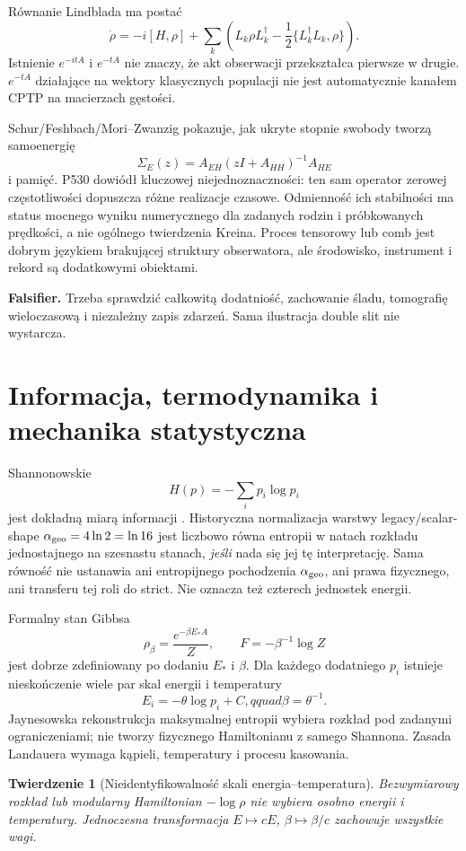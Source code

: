 \documentclass[11pt,a4paper]{article}
\newtheorem{theorem}{Twierdzenie}[section]
\begin{document}
Równanie Lindblada ma postać \cite{Lindblad,GKS}
\[
\dot\rho=-i[H,\rho]+\sum_k\left(L_k\rho L_k^\dagger-\frac12\{L_k^\dagger L_k,\rho\}\right).
\]
Istnienie $e^{-itA}$ i $e^{-tA}$ nie znaczy, że akt obserwacji przekształca pierwsze w drugie. $e^{-tA}$ działające na wektory klasycznych populacji nie jest automatycznie kanałem CPTP na macierzach gęstości.

Schur/Feshbach/Mori--Zwanzig pokazuje, jak ukryte stopnie swobody tworzą samoenergię
\[
\Sigma_E(z)=A_{EH}(zI+A_{HH})^{-1}A_{HE}
\]
i pamięć. P530 dowiódł kluczowej niejednoznaczności: ten sam operator zerowej częstotliwości dopuszcza różne realizacje czasowe. Odmienność ich stabilności ma status mocnego wyniku numerycznego dla zadanych rodzin i próbkowanych prędkości, a nie ogólnego twierdzenia Kreina. Proces tensorowy lub comb jest dobrym językiem brakującej struktury obserwatora, ale środowisko, instrument i rekord są dodatkowymi obiektami.

\textbf{Falsifier.} Trzeba sprawdzić całkowitą dodatniość, zachowanie śladu, tomografię wieloczasową i niezależny zapis zdarzeń. Sama ilustracja double slit nie wystarcza.

\section{Informacja, termodynamika i mechanika statystyczna}

Shannonowskie
\[
H(p)=-\sum_ip_i\log p_i
\]
jest dokładną miarą informacji \cite{Shannon}. Historyczna normalizacja warstwy legacy/scalar-shape $\alpha_{\rm geo}=4\ln2=\ln16$ jest liczbowo równa entropii w natach rozkładu jednostajnego na szesnastu stanach, \emph{jeśli} nada się jej tę interpretację. Sama równość nie ustanawia ani entropijnego pochodzenia $\alpha_{\rm geo}$, ani prawa fizycznego, ani transferu tej roli do strict. Nie oznacza też czterech jednostek energii.

Formalny stan Gibbsa
\[
\rho_\beta=\frac{e^{-\beta E_*A}}{Z},\qquad F=-\beta^{-1}\log Z
\]
jest dobrze zdefiniowany po dodaniu $E_*$ i $\beta$. Dla każdego dodatniego $p_i$ istnieje nieskończenie wiele par skal energii i temperatury
\[
E_i=-\theta\log p_i+C,qquad \beta=\theta^{-1}.
\]
Jaynesowska rekonstrukcja maksymalnej entropii \cite{Jaynes} wybiera rozkład pod zadanymi ograniczeniami; nie tworzy fizycznego Hamiltonianu z samego Shannona. Zasada Landauera \cite{Landauer} wymaga kąpieli, temperatury i procesu kasowania.

\begin{theorem}[Nieidentyfikowalność skali energia--temperatura]
Bezwymiarowy rozkład lub modularny Hamiltonian $-\log\rho$ nie wybiera osobno energii i temperatury. Jednoczesna transformacja $E\mapsto cE$, $\beta\mapsto\beta/c$ zachowuje wszystkie wagi.
\end{theorem}
\end{document}

